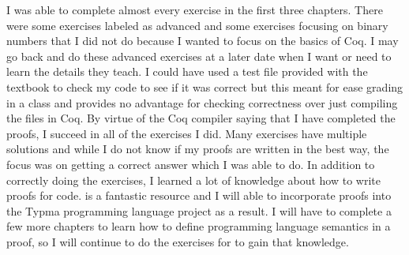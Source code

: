 \documentclass[10pt,twocolumn]{article}
\begin{document}
I was able to complete almost every exercise in the first three chapters. There were some exercises labeled as advanced and some exercises focusing on binary numbers that I did not do because I wanted to focus on the basics of Coq. I may go back and do these advanced exercises at a later date when I want or need to learn the details they teach. I could have used a test file provided with the textbook to check my code to see if it was correct but this meant for ease grading in a class and provides no advantage for checking correctness over just compiling the files in Coq. By virtue of the Coq compiler saying that I have completed the proofs, I succeed in all of the exercises I did. Many exercises have multiple solutions and while I do not know if my proofs are written in the best way, the focus was on getting a correct answer which I was able to do. In addition to correctly doing the exercises, I learned a lot of knowledge about how to write proofs for code. \textcite{Pierce2021Software} is a fantastic resource and I will able to incorporate proofs into the Typma programming language project as a result. I will have to complete a few more chapters to learn how to define programming language semantics in a proof, so I will continue to do the exercises for \textcite{Pierce2021Software} to gain that knowledge.

\printbibliography 
\end{document}
